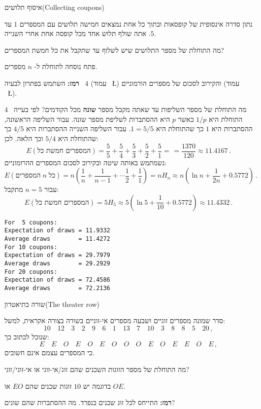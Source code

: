 \begin{prob}{איסוף תלושים}{}{(Collecting coupons)}

נתון סדרה אינסופית של קופסאות ובתוך כל אחת נמצאים חמישה תלושים עם המספרים 
$1$
עד
$5$.
אתה שולף תלוש אחד מכל קופסה אחת אחרי השנייה.

מה התוחלת של מספר התלושים שיש לשלוף עד שתקבל את כל חמשת המספרים?

פתח נוסחה לתוחלת ל-%
$n$
מספרים.

\textbf{רמז:}
השתמש בפתרון לבעיה%
~$4$
(עמוד%
~\L{\pageref{p.four}})
והקירוב לסכום של מספרים הורמוניים 
(עמוד%
~\L{\pageref{p.harmonic}}).
\end{prob}

\solution{}

מה התוחלת של מספר השליפות עד שאתה מקבל מספר
\textbf{שונה}
מכל הקודמים? לפי בעייה~%
$4$
התוחלת היא
$1/p$
כאשר 
$p$
היא ההסתברות לשליפת מספר שונה. עבור השליפה הראשונה, ההסתברות היא 
$1$
כך שהתוחלת היא
$1=5/5$.
עבור השליפה השנייה ההסתברות היא 
$4/5$
כך שהתוחלת היא 
$5/4$
וכך הלאה. לכן:
\[
E(\textrm{המספרים חמשת כל}) = \frac{5}{5}+\frac{5}{4} + \frac{5}{3} + \frac{5}{2} + \frac{5}{1} = \frac{}{} =\frac{1370}{120}\approx 11.4167\,.
\]
נשמתמש באותה שיטה ובקירוב לסכום המספרים ההרומוניים:
\[
E(\textrm{המספרים}\;n \;\textrm{כל}) = n\left(\frac{1}{n}+\frac{1}{n-1} + \cdots \frac{1}{2} + \frac{1}{1}\right) =nH_n\approx n\left(\ln n + \frac{1}{2n} + 0.5772\right)\,. 
\]
עבור
$n=5$
מתקבל:
\[
E(\textrm{המספרים חמשת כל}) =5H_5\approx 5\left(\ln 5 + \frac{1}{10} + 0.5772\right) \approx 11.4332\,.
\]

\sml{}
\begin{verbatim}
For  5 coupons:
Expectation of draws = 11.9332
Average draws        = 11.4272
For 10 coupons:
Expectation of draws = 29.7979
Average draws        = 29.2929
For 20 coupons:
Expectation of draws = 72.4586
Average draws        = 72.2136
\end{verbatim}


\newpage

\begin{prob}{שורה בתיאטרון}{}{(The theater row)}

סדר שמונה מספרים זוגיים ושבעה מספרים אי-זוגיים בשורה בצורה אקראית, למשל:
\[
10\quad 12\quad 3\quad 2\quad 9\quad 6 \quad 1\quad 13\quad 7\quad 10\quad 3\quad 8\quad 8\quad 5\quad 20\,,
\]
שנוכל לכתוב כך:
\[
E\quad E\quad O\quad E\quad O\quad E \quad O\quad O\quad O\quad E\quad O\quad E\quad E\quad O\quad E\,,
\]
כי המספרים עצמם אינם חשובים.

מה התוחלת של מספר הזוגות השכנים שהם זוג/אי-זוגי או אי-זוגי/זוגי?

בדוגמה יש $10$ זוגות שכנים שהם
$EO$ 
או 
$OE$.

\textbf{רמז:}
התייחס לכל זוג שכנים בנפרד. מה ההסתברות שהם שונים?
\end{prob}

